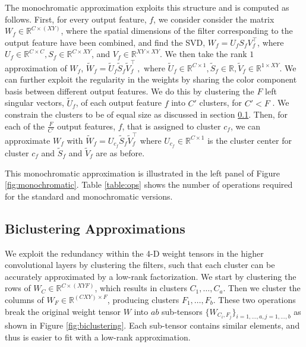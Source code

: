 The monochromatic approximation exploits this structure and is computed as follows.
First, for every output feature, $f$, we consider consider the matrix $W_f \in \mathbb{R}^{C \times (XY) }$, 
where the spatial dimensions of the filter corresponding to the output feature have been combined, and find the SVD, 
$W_f = U_f S_f V_f^{\top}$,
where $U_f \in \mathbb{R}^{C \times C}, S_f \in \mathbb{R}^{C \times XY}$, and $V_f \in \mathbb{R}^{XY \times XY}$. 
We then take the rank $1$ approximation of $W_f$, 
	$\tilde{W}_f = \tilde{U}_f \tilde{S}_f \tilde{V}_f^{\top} ~,$
where $\tilde{U}_f \in \mathbb{R}^{C \times 1}, \tilde{S}_f \in \mathbb{R}, \tilde{V}_f \in \mathbb{R}^{1 \times XY}$.
We can further exploit the regularity in the weights by sharing the color component basis between different output features. 
We do this by clustering the $F$ left singular vectors, $\tilde{U}_f$, of each output feature $f$ into $C'$ clusters, 
for $C' < F$  . We constrain the clusters to be of equal size as discussed in section \ref{subsec:clustering}.  
Then, for each of the $\frac{F}{C'}$ output features, $f$, that is assigned to cluster $c_f$, we can approximate $W_f$ with
	$\tilde{W}_f = U_{c_f} \tilde{S}_f \tilde{V}_f^{\top}$
where $U_{c_f} \in \mathbb{R}^{C \times 1}$ is the cluster center for cluster $c_f$ and $\tilde{S}_f$ and $\tilde{V}_f$ are as before. 

This monochromatic approximation is illustrated in the left panel of Figure \ref{fig:monochromatic}.
Table \ref{table:ops} shows the number of operations required for the standard and monochromatic versions.

\subsection{Biclustering Approximations}\label{subsec:clustering}

We exploit the redundancy within the 4-D weight tensors in the higher convolutional layers
by clustering the filters, such that each cluster can
be accurately approximated by a low-rank factorization. 
We start by clustering the rows of $W_C \in \mathbb{R}^{C \times (XYF)}$, which results in
clusters $C_1, \dots, C_a$. Then we cluster the columns of $W_F  \in
\mathbb{R}^{(CXY) \times F}$, producing clusters $F_1,
\dots, F_b$. These two operations break the original weight tensor $W$
into $ab$ sub-tensors $\{W_{C_i, F_j}\}_{i = 1, \dots, a, j = 1,
  \dots, b}$ as shown in Figure \ref{fig:biclustering}. Each
sub-tensor contains similar elements, and thus is easier to
fit with a low-rank approximation. 

